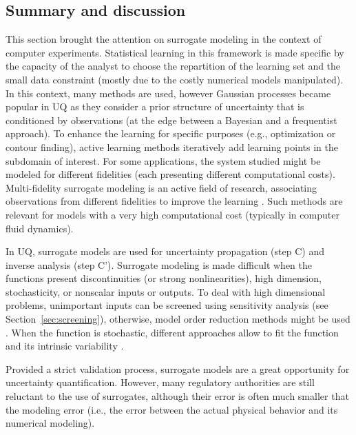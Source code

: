 \subsection{Summary and discussion}

This section brought the attention on surrogate modeling in the context of computer experiments. 
Statistical learning in this framework is made specific by the capacity of the analyst to choose the repartition of the learning set and the small data constraint (mostly due to the costly numerical models manipulated). 
In this context, many methods are used, however Gaussian processes became popular in UQ as they consider a prior structure of uncertainty that is conditioned by observations (at the edge between a Bayesian and a frequentist approach). 
To enhance the learning for specific purposes (e.g., optimization or contour finding), active learning methods iteratively add learning points in the subdomain of interest. 
For some applications, the system studied might be modeled for different fidelities (each presenting different computational costs). 
Multi-fidelity surrogate modeling is an active field of research, associating observations from different fidelities to improve the learning \citep{fernandez_2016_review_multifi}. 
Such methods are relevant for models with a very high computational cost (typically in computer fluid dynamics).  

In UQ, surrogate models are used for uncertainty propagation (step C) and inverse analysis (step C'). 
Surrogate modeling is made difficult when the functions present discontinuities (or strong nonlinearities), high dimension, stochasticity, or nonscalar inputs or outputs. 
To deal with high dimensional problems, unimportant inputs can be screened using sensitivity analysis (see Section~\ref{sec:screening}), otherwise, model order reduction methods might be used . 
When the function is stochastic, different approaches allow to fit the function and its intrinsic variability \citep{binois_2019_replication,baker_2020_stochastic_surrogates_review,zhu_2023_thesis}. 

Provided a strict validation process, surrogate models are a great opportunity for uncertainty quantification. 
However, many regulatory authorities are still reluctant to the use of surrogates, although their error is often much smaller that the modeling error (i.e., the error between the actual physical behavior and its numerical modeling). 


